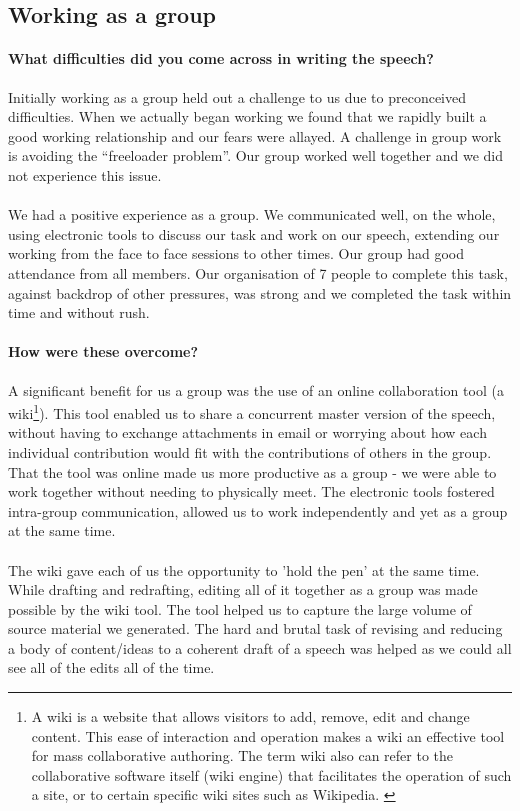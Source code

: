 \documentclass[12pt]{article}
\begin{document}
\begin{doublespace}
\section{Working as a group}
\paragraph{What difficulties did you come across in writing the speech?}Initially working as a group held out a challenge to us due to preconceived difficulties. When we actually began working we found that we rapidly built a good working relationship and our fears were allayed. A challenge in group work is avoiding the ``freeloader problem''. Our group worked well together and we did not experience this issue.

\paragraph{}We had a positive experience as a group. We communicated well, on the whole, using electronic tools to discuss our task and work on our speech, extending our working from the face to face sessions to other times. Our group had good attendance from all members. Our organisation of 7 people to complete this task, against backdrop of other pressures, was strong and we completed the task within time and without rush.

\paragraph{How were these overcome?}A significant benefit for us a group was the use of an online collaboration tool (a wiki\footnote{A wiki is a website that allows visitors to add, remove, edit and change content. This ease of interaction and operation makes a wiki an effective tool for mass collaborative authoring. The term wiki also can refer to the collaborative software itself (wiki engine) that facilitates the operation of such a site, or to certain specific wiki sites such as Wikipedia. \cite{wiki:fk}}). This tool enabled us to share a concurrent master version of the speech, without having to exchange attachments in email or worrying about how each individual contribution would fit with the contributions of others in the group. That the tool was online made us more productive as a group - we were able to work together without needing to physically meet. The electronic tools fostered intra-group communication, allowed us to work independently and yet as a group at the same time.

\paragraph{}The wiki gave each of us the opportunity to 'hold the pen' at the same time. While drafting and redrafting, editing all of it together as a group was made possible by the wiki tool. The tool helped us to capture the large volume of source material we generated. The hard and brutal task of revising and reducing a body of content/ideas to a coherent draft of a speech was helped as we could all see all of the edits all of the time.


\end{doublespace}
\end{document}
